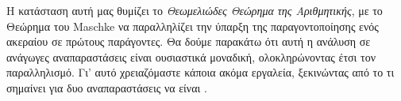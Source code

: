 \documentclass[12pt,a4paper,reqno]{amsart}
\begin{document}
Η κατάσταση αυτή μας θυμίζει το \emph{Θεωμελιώδες Θεώρημα της Αριθμητικής}, με το Θεώρημα του \textlatin{Maschke} να παραλληλίζει την ύπαρξη της παραγοντοποίησης ενός ακεραίου σε πρώτους παράγοντες. Θα δούμε παρακάτω ότι αυτή η ανάλυση σε ανάγωγες αναπαραστάσεις είναι ουσιαστικά μοναδική, ολοκληρώνοντας έτσι τον παραλληλισμό. Γι' αυτό χρειαζόμαστε κάποια ακόμα εργαλεία, ξεκινώντας από το τι σημαίνει για δυο αναπαραστάσεις να είναι . 
\end{document}
